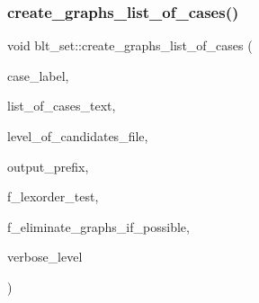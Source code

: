\subsubsection{\texorpdfstring{create\+\_\+graphs\+\_\+list\+\_\+of\+\_\+cases()}{create\_graphs\_list\_of\_cases()}}
{\footnotesize\ttfamily void blt\+\_\+set\+::create\+\_\+graphs\+\_\+list\+\_\+of\+\_\+cases (\begin{DoxyParamCaption}\item[{const \mbox{\hyperlink{galois_8h_ab6cc7b4aeb6ea31aba2b3fbfc83ff5e6}{B\+Y\+TE}} $\ast$}]{case\+\_\+label,  }\item[{const \mbox{\hyperlink{galois_8h_ab6cc7b4aeb6ea31aba2b3fbfc83ff5e6}{B\+Y\+TE}} $\ast$}]{list\+\_\+of\+\_\+cases\+\_\+text,  }\item[{\mbox{\hyperlink{galois_8h_a09fddde158a3a20bd2dcadb609de11dc}{I\+NT}}}]{level\+\_\+of\+\_\+candidates\+\_\+file,  }\item[{const \mbox{\hyperlink{galois_8h_ab6cc7b4aeb6ea31aba2b3fbfc83ff5e6}{B\+Y\+TE}} $\ast$}]{output\+\_\+prefix,  }\item[{\mbox{\hyperlink{galois_8h_a09fddde158a3a20bd2dcadb609de11dc}{I\+NT}}}]{f\+\_\+lexorder\+\_\+test,  }\item[{\mbox{\hyperlink{galois_8h_a09fddde158a3a20bd2dcadb609de11dc}{I\+NT}}}]{f\+\_\+eliminate\+\_\+graphs\+\_\+if\+\_\+possible,  }\item[{\mbox{\hyperlink{galois_8h_a09fddde158a3a20bd2dcadb609de11dc}{I\+NT}}}]{verbose\+\_\+level }\end{DoxyParamCaption})}

\mbox{\label{classblt__set_ae13ce00db0bbbf0a157ee02a3aaea3c7}} 
